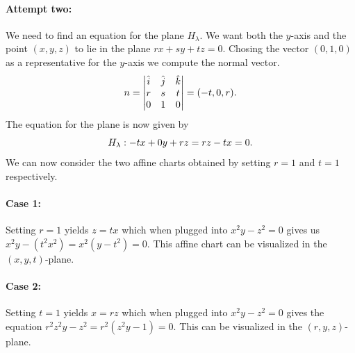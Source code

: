 \documentclass{article}
\begin{document}
\begin{example}
    \paragraph{Attempt two:}
    \label{par:attempt_two}
    
    We need to find an equation for the plane $H_\lambda$. We want both the
    $y$-axis and the point $(x, y, z)$ to lie in the plane $rx + sy + tz = 0$.
    Chosing the vector $(0, 1, 0)$ as a representative for the $y$-axis we compute the normal vector.
    \begin{equation}
        \notag
        n = \begin{vmatrix}
            \hat{i} & \hat{j} & \hat{k} \\
            r & s & t \\
            0 & 1 & 0
        \end{vmatrix} = (-t, 0, r).
    \end{equation}
    The equation for the plane is now given by
    \begin{equation}
        \notag
        H_\lambda : -tx + 0y + rz = rz - tx = 0.
    \end{equation}
    We can now consider the two affine charts obtained by setting $r = 1$ and $t = 1$ respectively.
    \paragraph{Case 1:} 
    \label{par:case_1_}
    Setting $r = 1$ yields $z = tx$ which when plugged into $x^2y - z^2 = 0$
    gives us $x^2y - (t^2x^2) = x^2(y - t^2) = 0$. This affine chart can be
    visualized in the $(x, y, t)$-plane.

    \paragraph{Case 2:}
    \label{par:case_2_}
    Setting $t = 1$ yields $x = rz$ which when plugged into $x^2y-z^2 = 0$
    gives the equation $r^2z^2y - z^2 = r^2(z^2y - 1) = 0$. This can be
    visualized in the $(r, y, z)$-plane.
    

\end{example}
\end{document}
